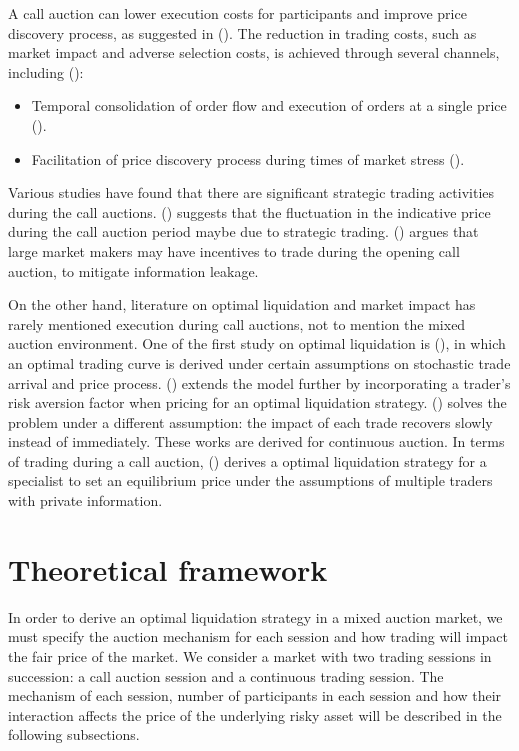 \documentclass{article}
\begin{document}
A call auction can lower execution costs for participants and improve price discovery process, as suggested in (\cite{Pagano2003}). The reduction in trading costs, such as market impact and adverse selection costs, is achieved through several channels, including (\cite{Carole2006}):

\begin{itemize}
  \item Temporal consolidation of order flow and execution of orders at a single price (\cite{Economides1995}).
  \item Facilitation of price discovery process during times of market stress (\cite{Madhavan1992}).
\end{itemize}

Various studies have found that there are significant strategic trading activities during the call auctions. (\cite{Bruno1999}) suggests that the fluctuation in the indicative price during the call auction period maybe due to strategic trading. (\cite{Vives2001}) argues that large market makers may have incentives to trade during the opening call auction, to mitigate information leakage.

On the other hand, literature on optimal liquidation and market impact has rarely mentioned execution during call auctions, not to mention the mixed auction environment. One of the first study on optimal liquidation is (\cite{HoStoll1981}), in which an optimal trading curve is derived under certain assumptions on stochastic trade arrival and price process. (\cite{AlmgrenChriss2000}) extends the model further by incorporating a trader's risk aversion factor when pricing for an optimal liquidation strategy. (\cite{Obizhaeva2013}) solves the problem under a different assumption: the impact of each trade recovers slowly instead of immediately. These works are derived for continuous auction. In terms of trading during a call auction, (\cite{Madhavan2015}) derives a optimal liquidation strategy for a specialist to set an equilibrium price under the assumptions of multiple traders with private information.

\section{Theoretical framework}\label{secTheoreticalFramework}

In order to derive an optimal liquidation strategy in a mixed auction market, we must specify the auction mechanism for each session and how trading will impact the fair price of the market. We consider a market with two trading sessions in succession: a call auction session and a continuous trading session. The mechanism of each session, number of participants in each session and how their interaction affects the price of the underlying risky asset will be described in the following subsections.
\end{document}
